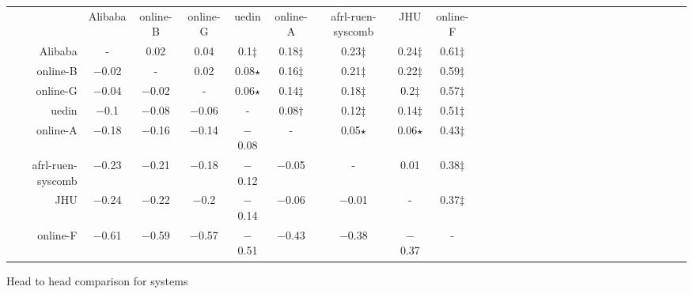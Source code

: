 \begin{tabular}{rccccccccccccccccccccccccccc}

 & Alibaba & online-B & online-G & uedin & online-A & afrl-ruen-syscomb & JHU & online-F \\ 
Alibaba & - &    0.02 &    0.04 &    0.1$\ddagger$ &    0.18$\ddagger$ &    0.23$\ddagger$ &    0.24$\ddagger$ &    0.61$\ddagger$ \\ 
online-B & $-$0.02 & - &    0.02 &    0.08$\star$ &    0.16$\ddagger$ &    0.21$\ddagger$ &    0.22$\ddagger$ &    0.59$\ddagger$ \\ 
online-G & $-$0.04 & $-$0.02 & - &    0.06$\star$ &    0.14$\ddagger$ &    0.18$\ddagger$ &    0.2$\ddagger$ &    0.57$\ddagger$ \\ 
uedin & $-$0.1 & $-$0.08 & $-$0.06 & - &    0.08$\dagger$ &    0.12$\ddagger$ &    0.14$\ddagger$ &    0.51$\ddagger$ \\ 
online-A & $-$0.18 & $-$0.16 & $-$0.14 & $-$0.08 & - &    0.05$\star$ &    0.06$\star$ &    0.43$\ddagger$ \\ 
afrl-ruen-syscomb & $-$0.23 & $-$0.21 & $-$0.18 & $-$0.12 & $-$0.05 & - &    0.01 &    0.38$\ddagger$ \\ 
JHU & $-$0.24 & $-$0.22 & $-$0.2 & $-$0.14 & $-$0.06 & $-$0.01 & - &    0.37$\ddagger$ \\ 
online-F & $-$0.61 & $-$0.59 & $-$0.57 & $-$0.51 & $-$0.43 & $-$0.38 & $-$0.37 & - \\ 


\end{tabular}
\caption{Head to head comparison for \RUen systems}
\label{pairwise-ruen}


